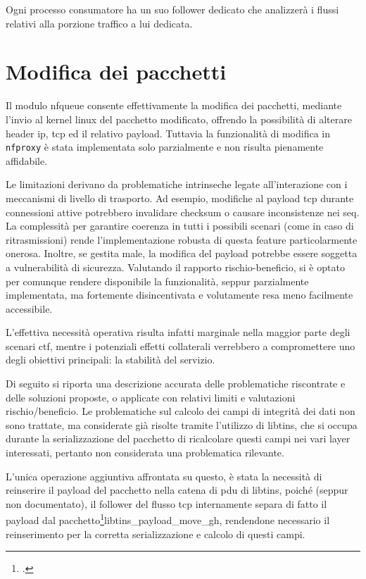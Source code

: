 Ogni processo consumatore ha un suo follower dedicato che analizzerà i flussi relativi alla porzione traffico a lui dedicata.

\section{Modifica dei pacchetti}

Il modulo \gls{nfqueue} consente effettivamente la modifica dei pacchetti, mediante l'invio al kernel linux del pacchetto modificato, offrendo la possibilità di alterare header
\gls{ip}, \gls{tcp} ed il relativo payload. Tuttavia la funzionalità di modifica in \texttt{nfproxy} è stata implementata solo parzialmente e non risulta pienamente affidabile.

Le limitazioni derivano da problematiche intrinseche legate all’interazione con i meccanismi di livello di trasporto. Ad esempio, modifiche al payload \gls{tcp} durante connessioni attive potrebbero invalidare checksum o causare inconsistenze nei \gls{seq}. La complessità per garantire coerenza in tutti i possibili scenari (come in caso di ritrasmissioni) rende l’implementazione robusta di questa feature particolarmente onerosa. Inoltre, se gestita male, la modifica del payload potrebbe essere soggetta a vulnerabilità di sicurezza. Valutando il rapporto rischio-beneficio, si è optato per comunque rendere disponibile la funzionalità, seppur parzialmente implementata, ma fortemente disincentivata e volutamente resa meno facilmente accessibile.

L’effettiva necessità operativa risulta infatti marginale nella maggior parte degli scenari \gls{ctf}, mentre i potenziali effetti collaterali verrebbero a compromettere uno degli obiettivi principali: la stabilità del servizio.

Di seguito si riporta una descrizione accurata delle problematiche riscontrate e delle soluzioni proposte, o applicate con relativi limiti e valutazioni rischio/beneficio.
Le problematiche sul calcolo dei campi di integrità dei dati non sono trattate, ma considerate già risolte tramite l'utilizzo di libtins, che si occupa durante la serializzazione del pacchetto di ricalcolare questi campi nei vari layer interessati, pertanto non considerata una problematica rilevante.

L'unica operazione aggiuntiva affrontata su questo, è stata la necessità di reinserire il payload del pacchetto nella catena di \gls{pdu} di libtins, poiché (seppur non documentato), il follower del flusso \gls{tcp} internamente separa di fatto il payload dal pacchetto\footcite{Libtins, istruzione per la separazione del payload nel follower (std::move del payload)}{libtins_payload_move_gh}, rendendone necessario il reinserimento per la corretta serializzazione e calcolo di questi campi.

